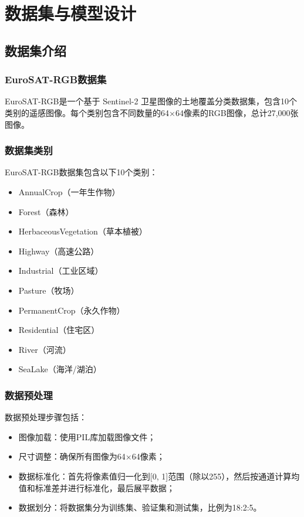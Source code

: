 \documentclass[UTF8]{article}
\begin{document}
\section{数据集与模型设计}

\subsection{数据集介绍}

\subsubsection{EuroSAT-RGB数据集}
EuroSAT-RGB是一个基于 Sentinel-2 卫星图像的土地覆盖分类数据集，包含10个类别的遥感图像。每个类别包含不同数量的64×64像素的RGB图像，总计27,000张图像。

\subsubsection{数据集类别}
EuroSAT-RGB数据集包含以下10个类别：
\begin{itemize}[topsep=0pt, partopsep=0pt, itemsep=0pt, parsep=0pt]
    \item AnnualCrop（一年生作物）
    \item Forest（森林）
    \item HerbaceousVegetation（草本植被）
    \item Highway（高速公路）
    \item Industrial（工业区域）
    \item Pasture（牧场）
    \item PermanentCrop（永久作物）
    \item Residential（住宅区）
    \item River（河流）
    \item SeaLake（海洋/湖泊）
\end{itemize}
\subsubsection{数据预处理}
数据预处理步骤包括：
\begin{itemize}[topsep=0pt, partopsep=0pt, itemsep=0pt, parsep=0pt]
    \item 图像加载：使用PIL库加载图像文件；
    \item 尺寸调整：确保所有图像为64×64像素；
    \item 数据标准化：首先将像素值归一化到[0, 1]范围（除以255），然后按通道计算均值和标准差并进行标准化，最后展平数据；
    \item 数据划分：将数据集分为训练集、验证集和测试集，比例为18:2:5。
\end{itemize}
\end{document}
